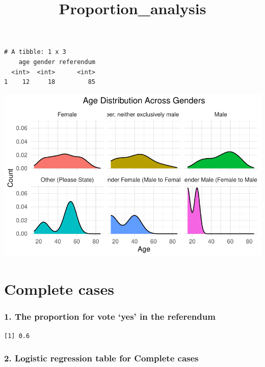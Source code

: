\documentclass[
  letterpaper,
  DIV=11,
  numbers=noendperiod]{scrartcl}
\title{Proportion\_analysis}
\author{}
\date{}
\begin{document}
\maketitle


\begin{verbatim}
# A tibble: 1 x 3
    age gender referendum
  <int>  <int>      <int>
1    12     18         85
\end{verbatim}

\includegraphics{Proportion_analysis_files/figure-pdf/unnamed-chunk-4-1.pdf}

\section{Complete cases}\label{complete-cases}

\subsubsection{1. The proportion for vote `yes' in the
referendum}\label{the-proportion-for-vote-yes-in-the-referendum}

\begin{verbatim}
[1] 0.6
\end{verbatim}

\subsubsection{2. Logistic regression table for Complete
cases}\label{logistic-regression-table-for-complete-cases}
\end{document}
